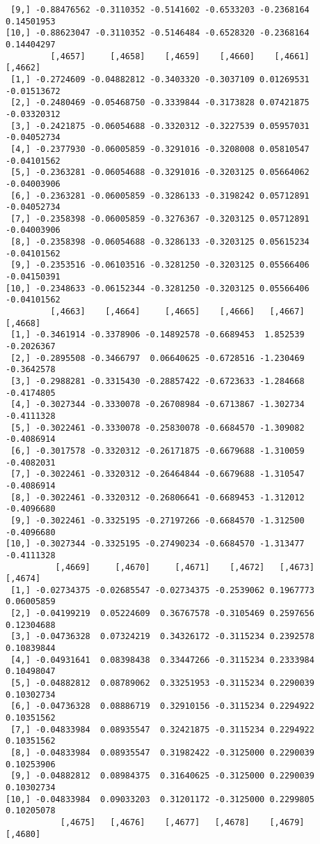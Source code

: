 \documentclass[
  letterpaper,
  DIV=11,
  numbers=noendperiod]{scrreprt}
\begin{document}
\begin{verbatim}
 [9,] -0.88476562 -0.3110352 -0.5141602 -0.6533203 -0.2368164 0.14501953
[10,] -0.88623047 -0.3110352 -0.5146484 -0.6528320 -0.2368164 0.14404297
         [,4657]     [,4658]    [,4659]    [,4660]    [,4661]     [,4662]
 [1,] -0.2724609 -0.04882812 -0.3403320 -0.3037109 0.01269531 -0.01513672
 [2,] -0.2480469 -0.05468750 -0.3339844 -0.3173828 0.07421875 -0.03320312
 [3,] -0.2421875 -0.06054688 -0.3320312 -0.3227539 0.05957031 -0.04052734
 [4,] -0.2377930 -0.06005859 -0.3291016 -0.3208008 0.05810547 -0.04101562
 [5,] -0.2363281 -0.06054688 -0.3291016 -0.3203125 0.05664062 -0.04003906
 [6,] -0.2363281 -0.06005859 -0.3286133 -0.3198242 0.05712891 -0.04052734
 [7,] -0.2358398 -0.06005859 -0.3276367 -0.3203125 0.05712891 -0.04003906
 [8,] -0.2358398 -0.06054688 -0.3286133 -0.3203125 0.05615234 -0.04101562
 [9,] -0.2353516 -0.06103516 -0.3281250 -0.3203125 0.05566406 -0.04150391
[10,] -0.2348633 -0.06152344 -0.3281250 -0.3203125 0.05566406 -0.04101562
         [,4663]    [,4664]     [,4665]    [,4666]   [,4667]    [,4668]
 [1,] -0.3461914 -0.3378906 -0.14892578 -0.6689453  1.852539 -0.2026367
 [2,] -0.2895508 -0.3466797  0.06640625 -0.6728516 -1.230469 -0.3642578
 [3,] -0.2988281 -0.3315430 -0.28857422 -0.6723633 -1.284668 -0.4174805
 [4,] -0.3027344 -0.3330078 -0.26708984 -0.6713867 -1.302734 -0.4111328
 [5,] -0.3022461 -0.3330078 -0.25830078 -0.6684570 -1.309082 -0.4086914
 [6,] -0.3017578 -0.3320312 -0.26171875 -0.6679688 -1.310059 -0.4082031
 [7,] -0.3022461 -0.3320312 -0.26464844 -0.6679688 -1.310547 -0.4086914
 [8,] -0.3022461 -0.3320312 -0.26806641 -0.6689453 -1.312012 -0.4096680
 [9,] -0.3022461 -0.3325195 -0.27197266 -0.6684570 -1.312500 -0.4096680
[10,] -0.3027344 -0.3325195 -0.27490234 -0.6684570 -1.313477 -0.4111328
          [,4669]     [,4670]     [,4671]    [,4672]   [,4673]    [,4674]
 [1,] -0.02734375 -0.02685547 -0.02734375 -0.2539062 0.1967773 0.06005859
 [2,] -0.04199219  0.05224609  0.36767578 -0.3105469 0.2597656 0.12304688
 [3,] -0.04736328  0.07324219  0.34326172 -0.3115234 0.2392578 0.10839844
 [4,] -0.04931641  0.08398438  0.33447266 -0.3115234 0.2333984 0.10498047
 [5,] -0.04882812  0.08789062  0.33251953 -0.3115234 0.2290039 0.10302734
 [6,] -0.04736328  0.08886719  0.32910156 -0.3115234 0.2294922 0.10351562
 [7,] -0.04833984  0.08935547  0.32421875 -0.3115234 0.2294922 0.10351562
 [8,] -0.04833984  0.08935547  0.31982422 -0.3125000 0.2290039 0.10253906
 [9,] -0.04882812  0.08984375  0.31640625 -0.3125000 0.2290039 0.10302734
[10,] -0.04833984  0.09033203  0.31201172 -0.3125000 0.2299805 0.10205078
           [,4675]   [,4676]    [,4677]   [,4678]    [,4679]    [,4680]

\end{verbatim}
\end{document}
